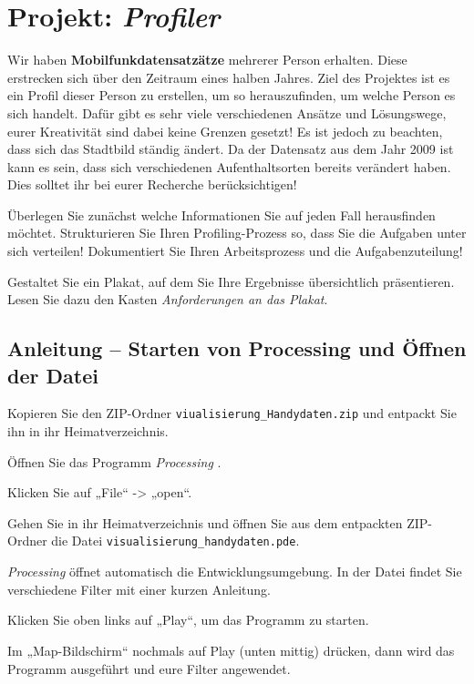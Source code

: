 \documentclass[loesung]{schulein}
\begin{document}
 
%
\section*{Projekt: \textit{Profiler}}
Wir haben \textbf{Mobilfunkdatensatzätze} mehrerer Person erhalten. Diese erstrecken sich über den Zeitraum eines halben Jahres. Ziel des Projektes ist es ein Profil dieser Person zu erstellen, um so herauszufinden, um welche Person es sich handelt. Dafür gibt es sehr viele verschiedenen Ansätze und Lösungswege, eurer Kreativität sind dabei keine Grenzen gesetzt! Es ist jedoch zu beachten, dass sich das Stadtbild ständig ändert. Da der Datensatz aus dem Jahr 2009 ist kann es sein, dass sich verschiedenen Aufenthaltsorten bereits verändert haben. Dies solltet ihr bei eurer Recherche berücksichtigen!

\begin{aufgaben}
\item Überlegen Sie zunächst welche Informationen Sie auf jeden Fall herausfinden möchtet. Strukturieren Sie Ihren Profiling-Prozess so, dass Sie die Aufgaben unter sich verteilen! Dokumentiert Sie Ihren Arbeitsprozess und die Aufgabenzuteilung!

\item Gestaltet Sie ein Plakat, auf dem Sie Ihre  Ergebnisse übersichtlich präsentieren. Lesen Sie dazu den Kasten \textit{Anforderungen an das Plakat}.  

\end{aufgaben}
%
\begin{aufgabenbox}{}{}
\vspace*{-1em}
\subsection*{Anleitung -- Starten von Processing und Öffnen der Datei
}
\begin{smallitemize}
\item Kopieren Sie den ZIP-Ordner \texttt{viualisierung\_Handydaten.zip} und entpackt Sie ihn in ihr Heimatverzeichnis.
\item Öffnen Sie das Programm \textit{Processing} .
\item Klicken Sie auf „File“ -> „open“.
\item Gehen Sie in ihr Heimatverzeichnis und öffnen Sie aus dem entpackten ZIP-Ordner die Datei \texttt{visualisierung\_handydaten.pde}.
\item \textit{Processing} öffnet automatisch die Entwicklungsumgebung. In der Datei
findet Sie verschiedene Filter mit einer kurzen Anleitung.
\item Klicken Sie oben links auf „Play“, um das Programm zu starten.
\item Im „Map-Bildschirm“ nochmals auf Play (unten mittig) drücken, dann wird das Programm ausgeführt und eure Filter angewendet.


\end{smallitemize}
\end{aufgabenbox}
\end{document}
